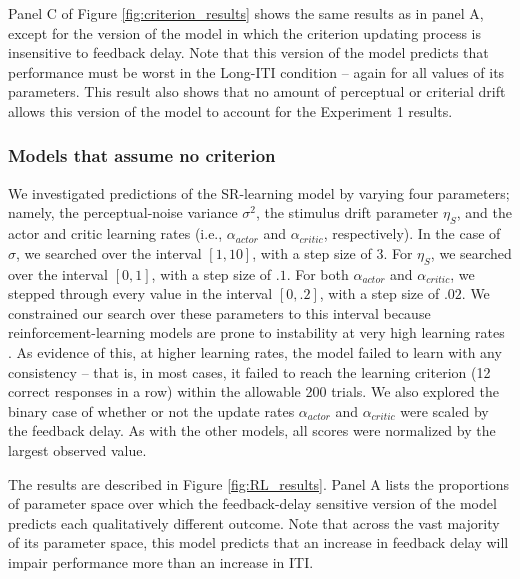 \documentclass[doc, floatsintext]{apa7}
\begin{document}
Panel C of Figure \ref{fig:criterion_results} shows the same
results as in panel A, except for the version of the model
in which the criterion updating process is insensitive to
feedback delay. Note that this version of the model predicts
that performance must be worst in the Long-ITI condition --
again for all values of its parameters. This result also
shows that no amount of perceptual or criterial drift allows
this version of the model to account for the Experiment 1
results. 

\subsubsection{Models that assume no criterion}
We investigated predictions of the SR-learning model by
varying four parameters; namely, the perceptual-noise
variance $\sigma^2$, the stimulus drift parameter $\eta_S$,
and the actor and critic learning rates (i.e.,
$\alpha_{actor}$ and $\alpha_{critic}$, respectively). In
the case of $\sigma$, we searched over the interval $[1,
10]$, with a step size of $3$. For $\eta_S$, we searched
over the interval $[0, 1]$, with a step size of $.1$. For
both $\alpha_{actor}$ and $\alpha_{critic}$, we stepped
through every value in the interval $[0, .2]$, with a step
size of $.02$. We constrained our search over these
parameters to this interval because reinforcement-learning
models are prone to instability at very high learning rates
\parencite{SuttonBarto1998}. As evidence of this, at higher
learning rates, the model failed to learn with any
consistency -- that is, in most cases, it failed to reach
the learning criterion (12 correct responses in a row)
within the allowable 200 trials.   We also explored the
binary case of whether or not the update rates
$\alpha_{actor}$ and $\alpha_{critic}$ were scaled by the
feedback delay. As with the other models, all scores were
normalized by the largest observed value.

The results are described in Figure \ref{fig:RL_results}.
Panel A lists the proportions of parameter space over which
the feedback-delay sensitive version of the model predicts
each qualitatively different outcome. Note that across the
vast majority of its parameter space, this model predicts
that an increase in feedback delay will impair performance
more than an increase in ITI. 
\end{document}
